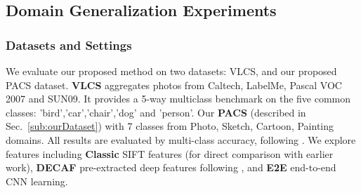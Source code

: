 \documentclass[10pt,twocolumn,letterpaper]{article}
\begin{document}
\subsection{Domain Generalization Experiments}
\subsubsection{Datasets and Settings}
We evaluate our proposed method on two datasets:  VLCS, and our proposed PACS dataset. \textbf{VLCS} \cite{torralba2011dataset_bias} aggregates photos from Caltech, LabelMe, Pascal VOC 2007 and SUN09. It provides a 5-way multiclass benchmark on the five common classes: 'bird','car','chair','dog' and 'person'. 
Our \textbf{PACS}  (described in Sec.~\ref{sub:ourDataset}) with 7 classes
from Photo, Sketch, Cartoon, Painting domains. 
All results are evaluated by multi-class accuracy, following \cite{ghifary2015domain}. We explore features including \textbf{Classic} SIFT features (for direct comparison with earlier work), \textbf{DECAF} pre-extracted deep features following \cite{ghifary2015domain}, and \textbf{E2E} end-to-end CNN learning.
\end{document}
